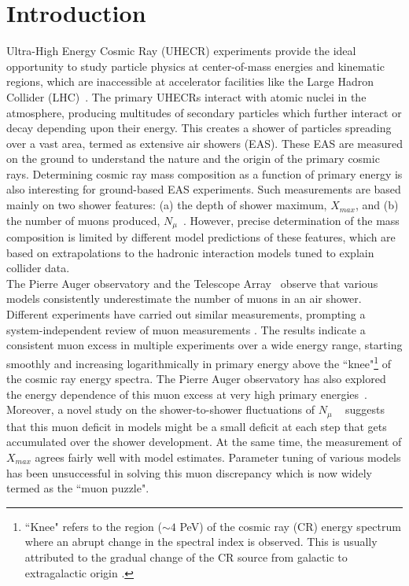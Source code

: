 \documentclass[aps,twocolumn,nofootinbib]{revtex4-1}
\begin{document}
\section{Introduction}
\label{into}
Ultra-High Energy Cosmic Ray (UHECR) experiments provide the ideal opportunity to study particle physics at center-of-mass energies and kinematic regions, which are inaccessible at accelerator facilities like the Large Hadron Collider (LHC)~\cite{Anchordoqui:2018qom}. The primary UHECRs interact with atomic nuclei in the atmosphere, producing multitudes of secondary particles which further interact or decay depending upon their energy. This creates a shower of particles spreading over a vast area, termed as extensive air showers (EAS). These EAS are measured on the ground to understand the nature and the origin of the primary cosmic rays. Determining cosmic ray mass composition as a function of primary energy is also interesting for ground-based EAS experiments. Such measurements are based mainly on two shower features: (a) the depth of shower maximum, $X_{max}$, and (b) the number of muons produced, $N_\mu$~\cite{Albrecht:2021cxw,Ostapchenko:2016dxc}. However, precise determination of the mass composition is limited by different model predictions of these features, which are based on extrapolations to the hadronic interaction models tuned to explain collider data.\\


The Pierre Auger observatory \cite{PierreAuger:2014ucz,PierreAuger:2016nfk} and the Telescope Array~\cite{TelescopeArray:2018eph} observe that various models consistently underestimate the number of muons in an air shower. Different experiments have carried out similar measurements, prompting a system-independent review of muon measurements \cite{EAS-MSU:2019kmv}. The results indicate a consistent muon excess in multiple experiments over a wide energy range, starting smoothly and increasing logarithmically in primary energy above the ``knee"\footnote{``Knee" refers to the region ($\sim 4$ PeV) of the cosmic ray (CR) energy spectrum where an abrupt change in the spectral index is observed. This is usually attributed to the gradual change of the CR source from galactic to extragalactic origin \cite{IceCube:2013ftu}.} of the cosmic ray energy spectra. The Pierre Auger observatory has also explored the energy dependence of this muon excess at very high primary energies~\cite{PierreAuger:2014ucz}. Moreover, a novel study on the shower-to-shower fluctuations of $N_\mu$ ~\cite{PierreAuger:2021qsd} suggests that this muon deficit in models might be a small deficit at each step that gets accumulated over the shower development. At the same time, the measurement of $X_{max}$ agrees fairly well with model estimates. Parameter tuning of various models has been unsuccessful in solving this muon discrepancy which is now widely termed as the ``muon puzzle". 
\end{document}
